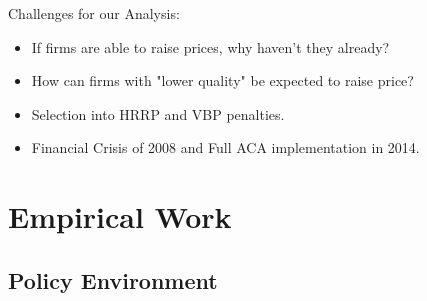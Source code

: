 \documentclass[ucs,9pt]{beamer}
\begin{document}
\begin{frame}{Challenges for our Analysis:}
\begin{itemize}
\item If firms are able to raise prices, why haven't they already?
\item How can firms with "lower quality" be expected to raise price?
\item Selection into HRRP and VBP penalties.
\item Financial Crisis of 2008 and Full ACA implementation in 2014.
\end{itemize}
\end{frame}




\section{Empirical Work}
\subsection{Policy Environment}

\end{document}
